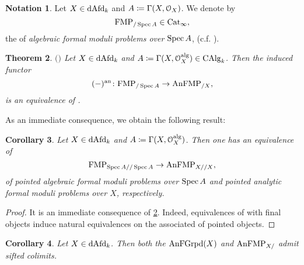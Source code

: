 \documentclass[10pt,a4paper,reqno]{amsart} %
\theoremstyle{plain}
\newtheorem{thm}{Theorem}[section]
\newtheorem{cor}[thm]{Corollary}
\theoremstyle{definition}
\newtheorem{notation}[thm]{Notation}
\theoremstyle{remark}
\numberwithin{equation}{section}
\begin{document}
\begin{notation}
    Let $X \in \mathrm{dAfd}_k$ and $A \coloneqq \Gamma(X, \mathcal O_X)$. We denote by
        \[
            \mathrm{FMP}_{/\operatorname{Spec} A} \in \mathrm{Cat}_\infty,  
        \]
    the \infcat of \emph{algebraic formal moduli problems over $\operatorname{Spec} A$}, (c.f. \cite[Definition 6.11]{Porta_Yu_NQK}).
\end{notation}

\begin{thm}$\mathrm{(}$\cite[Theorem 6.12]{Porta_Yu_NQK}$\mathrm )$ \label{thm:equivalence_between_analytic_and_algebraic_formal_moduli_problems_over}
    Let $X \in \mathrm{dAfd}_k$ and $A \coloneqq \Gamma(X, \mathcal O_X^\mathrm{alg}) \in \mathrm{CAlg}_k$. Then the induced functor
        \[
            (-) ^\mathrm{an} \colon \mathrm{FMP}_{/ \operatorname{Spec} A} \to \mathrm{AnFMP}_{/X},
        \]
    is an equivalence of \infcats.
\end{thm}

As an immediate consequence, we obtain the following result:

\begin{cor} \label{cor:equivalence_between_pointed_analytic_and_algebraic_formal_moduli_problems_over}
    Let $X \in \mathrm{dAfd}_k$ and $A \coloneqq \Gamma(X, \mathcal O_X^\mathrm{alg})$. Then one has an equivalence of \infcats
        \[
            \mathrm{FMP}_{\operatorname{Spec} A/ /\operatorname{Spec} A} \to \mathrm{AnFMP}_{X/ /X} ,
        \]
    of pointed algebraic formal moduli problems over $\operatorname{Spec} A$ and pointed analytic formal moduli problems over $X$, respectively.
\end{cor}

\begin{proof}
    It is an immediate consequence of \cref{thm:equivalence_between_analytic_and_algebraic_formal_moduli_problems_over}. Indeed, equivalences of \infcats with final objects
    induce natural equivalences on the associated \infcats of pointed objects.
\end{proof}


\begin{cor}
    Let $X \in \mathrm{dAfd}_k$. Then both the \infcats $\mathrm{AnFGrpd}(X)$ and $\mathrm{AnFMP}_{X/}$ admit sifted colimits.
\end{cor}
\end{document}
